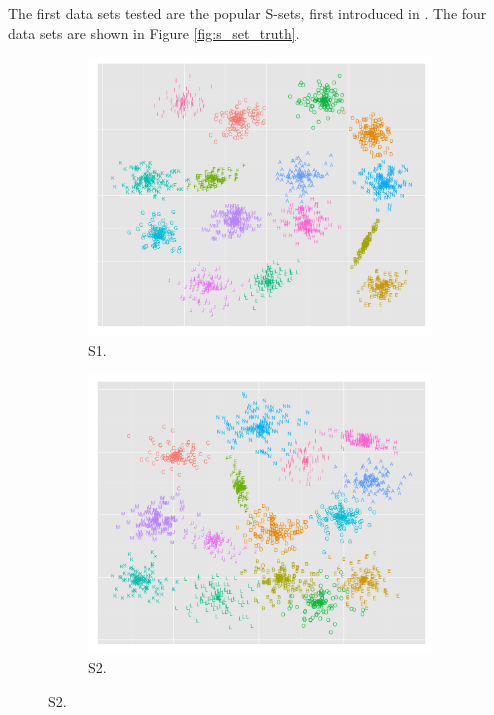 The first data sets tested are the popular S-sets, first introduced in \cite{Franti2006}. The four data sets are shown in Figure \ref{fig:s_set_truth}.

\begin{figure}[H]
\centering
\begin{subfigure}{.4\textwidth}
  \centering
  \includegraphics[width=.9\linewidth]{s_set/s_set_1_truth.png}
  \caption{S1.}
\end{subfigure}%
\begin{subfigure}{.4\textwidth}
  \centering
  \includegraphics[width=.9\linewidth]{s_set/s_set_2_truth.png}
  \caption{S2.}
\end{subfigure}


\end{figure}
